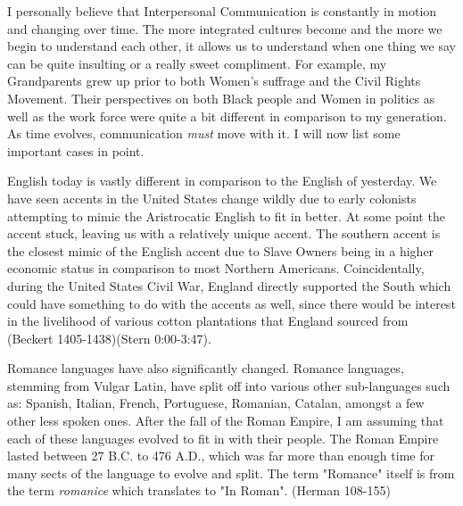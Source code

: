 \documentclass[12pt]{article}
\begin{document}
\par
I personally believe that Interpersonal Communication is constantly in motion and changing over time. The more integrated cultures become and the more we begin to understand each other, it allows us to understand when one thing we say can be quite insulting or a really sweet compliment. For example, my Grandparents grew up prior to both Women's suffrage and the Civil Rights Movement. Their perspectives on  both Black people and Women in politics as well as the work force were quite a bit different in comparison to my generation. As time evolves, communication \emph{must} move with it. I will now list some important cases in point.
\par
English today is vastly different in comparison to the English of yesterday. We have seen accents in the United States change wildly due to early colonists attempting to mimic the Aristrocatic English to fit in better. At some point the accent stuck, leaving us with a relatively unique accent. The southern accent is the closest mimic of the English accent due to Slave Owners being in a higher economic status in comparison to most Northern Americans. Coincidentally, during the United States Civil War, England directly supported the South which could have something to do with the accents as well, since there would be interest in the livelihood of various cotton plantations that England sourced from (Beckert 1405-1438)(Stern 0:00-3:47). 
\par
Romance languages have also significantly changed. Romance languages, stemming from Vulgar Latin, have split off into various other sub-languages such as: Spanish, Italian, French, Portuguese, Romanian, Catalan, amongst a few other less spoken ones. After the fall of the Roman Empire, I am assuming that each of these languages evolved to fit in with their people. The Roman Empire lasted between 27 B.C. to 476 A.D., which was far more than enough time for many sects of the language to evolve and split. The term "Romance" itself is from the term \textit{romanice} which translates to "In Roman". (Herman 108-155) 
\end{document}
